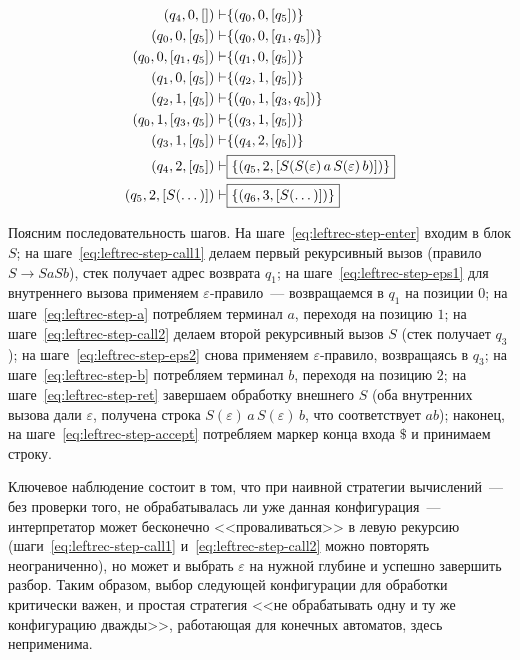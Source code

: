 \begin{align}
    \setcounter{equation}{0}
    (q_4,0,[])           \vdash & \{(q_0,0,[q_5])\}                                               \label{eq:leftrec-step-enter}  \\
    (q_0,0,[q_5])        \vdash & \{(q_0,0,[q_1,q_5])\}                                           \label{eq:leftrec-step-call1}  \\
    (q_0,0,[q_1,q_5])    \vdash & \{(q_1,0,[q_5])\}                                               \label{eq:leftrec-step-eps1}   \\
    (q_1,0,[q_5])        \vdash & \{(q_2,1,[q_5])\}                                               \label{eq:leftrec-step-a}      \\
    (q_2,1,[q_5])        \vdash & \{(q_0,1,[q_3,q_5])\}                                           \label{eq:leftrec-step-call2}  \\
    (q_0,1,[q_3,q_5])    \vdash & \{(q_3,1,[q_5])\}                                               \label{eq:leftrec-step-eps2}   \\
    (q_3,1,[q_5])        \vdash & \{(q_4,2,[q_5])\}                                               \label{eq:leftrec-step-b}      \\
    (q_4,2,[q_5])        \vdash & \boxed{\{(q_5,2,[S(S(\varepsilon)\,a\,S(\varepsilon)\,b)])\}}   \label{eq:leftrec-step-ret}    \\
    (q_5,2,[S(\dots)])   \vdash & \boxed{\{(q_6,3,[S(\dots)])\}}                                  \label{eq:leftrec-step-accept}
\end{align}

Поясним последовательность шагов.
На шаге~\ref{eq:leftrec-step-enter} входим в блок $S$; на шаге~\ref{eq:leftrec-step-call1} делаем первый рекурсивный вызов (правило $S \to S a S b$), стек получает адрес возврата $q_1$; на шаге~\ref{eq:leftrec-step-eps1} для внутреннего вызова применяем $\varepsilon$-правило~--- возвращаемся в $q_1$ на позиции $0$; на шаге~\ref{eq:leftrec-step-a} потребляем терминал $a$, переходя на позицию $1$; на шаге~\ref{eq:leftrec-step-call2} делаем второй рекурсивный вызов $S$ (стек получает $q_3$); на шаге~\ref{eq:leftrec-step-eps2} снова применяем $\varepsilon$-правило, возвращаясь в $q_3$; на шаге~\ref{eq:leftrec-step-b} потребляем терминал $b$, переходя на позицию $2$; на шаге~\ref{eq:leftrec-step-ret} завершаем обработку внешнего $S$ (оба внутренних вызова дали $\varepsilon$, получена строка $S(\varepsilon)\,a\,S(\varepsilon)\,b$, что соответствует $ab$); наконец, на шаге~\ref{eq:leftrec-step-accept} потребляем маркер конца входа $\$$ и принимаем строку.

Ключевое наблюдение состоит в том, что при наивной стратегии вычислений~--- без проверки того, не обрабатывалась ли уже данная конфигурация~--- интерпретатор может бесконечно <<проваливаться>> в левую рекурсию (шаги~\ref{eq:leftrec-step-call1} и~\ref{eq:leftrec-step-call2} можно повторять неограниченно), но может и выбрать $\varepsilon$ на нужной глубине и успешно завершить разбор.
Таким образом, выбор следующей конфигурации для обработки критически важен, и простая стратегия <<не обрабатывать одну и ту же конфигурацию дважды>>, работающая для конечных автоматов, здесь неприменима.

